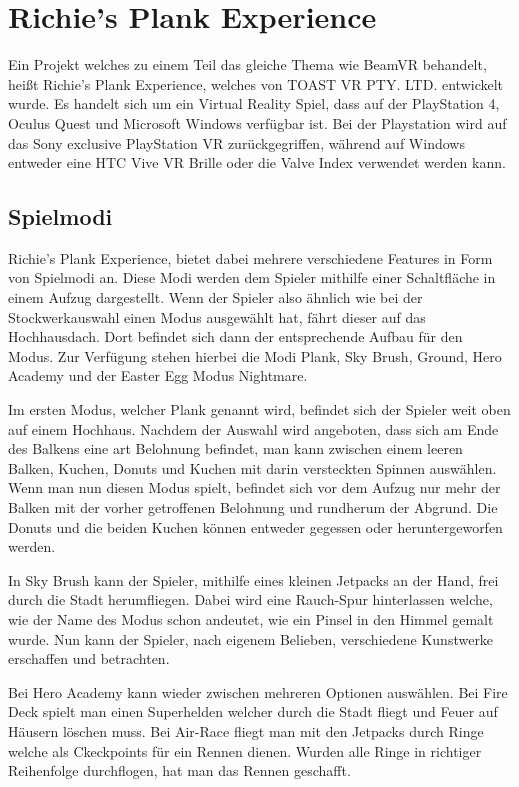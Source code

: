 \section{Richie's Plank Experience}
Ein Projekt welches zu einem Teil das gleiche Thema wie BeamVR behandelt, heißt Richie's Plank Experience, welches von TOAST VR PTY. LTD. entwickelt wurde.
Es handelt sich um ein Virtual Reality Spiel, dass auf der PlayStation 4, Oculus Quest und Microsoft Windows verfügbar ist.
Bei der Playstation wird auf das Sony exclusive PlayStation VR zurückgegriffen, während auf Windows entweder eine HTC Vive VR Brille oder die Valve Index verwendet werden kann.

\subsection{Spielmodi}
Richie's Plank Experience, bietet dabei mehrere verschiedene Features in Form von Spielmodi an.
Diese Modi werden dem Spieler mithilfe einer Schaltfläche in einem Aufzug dargestellt.
Wenn der Spieler also ähnlich wie bei der Stockwerkauswahl einen Modus ausgewählt hat, fährt dieser auf das Hochhausdach.
Dort befindet sich dann der entsprechende Aufbau für den Modus.
Zur Verfügung stehen hierbei die Modi Plank, Sky Brush, Ground, Hero Academy und der Easter Egg Modus Nightmare.

Im ersten Modus, welcher Plank genannt wird, befindet sich der Spieler weit oben auf einem Hochhaus.
Nachdem der Auswahl wird angeboten, dass sich am Ende des Balkens eine art Belohnung befindet, man kann zwischen einem leeren Balken, Kuchen, Donuts und Kuchen mit darin versteckten Spinnen auswählen.
Wenn man nun diesen Modus spielt, befindet sich vor dem Aufzug nur mehr der Balken mit der vorher getroffenen Belohnung und rundherum der Abgrund.
Die Donuts und die beiden Kuchen können entweder gegessen oder heruntergeworfen werden.

In Sky Brush kann der Spieler, mithilfe eines kleinen Jetpacks an der Hand, frei durch die Stadt herumfliegen.
Dabei wird eine Rauch-Spur hinterlassen welche, wie der Name des Modus schon andeutet, wie ein Pinsel in den Himmel gemalt wurde.
Nun kann der Spieler, nach eigenem Belieben, verschiedene Kunstwerke erschaffen und betrachten.

Bei Hero Academy kann wieder zwischen mehreren Optionen auswählen.
Bei Fire Deck spielt man einen Superhelden welcher durch die Stadt fliegt und Feuer auf Häusern löschen muss.
Bei Air-Race fliegt man mit den Jetpacks durch Ringe welche als Ckeckpoints für ein Rennen dienen.
Wurden alle Ringe in richtiger Reihenfolge durchflogen, hat man das Rennen geschafft.

